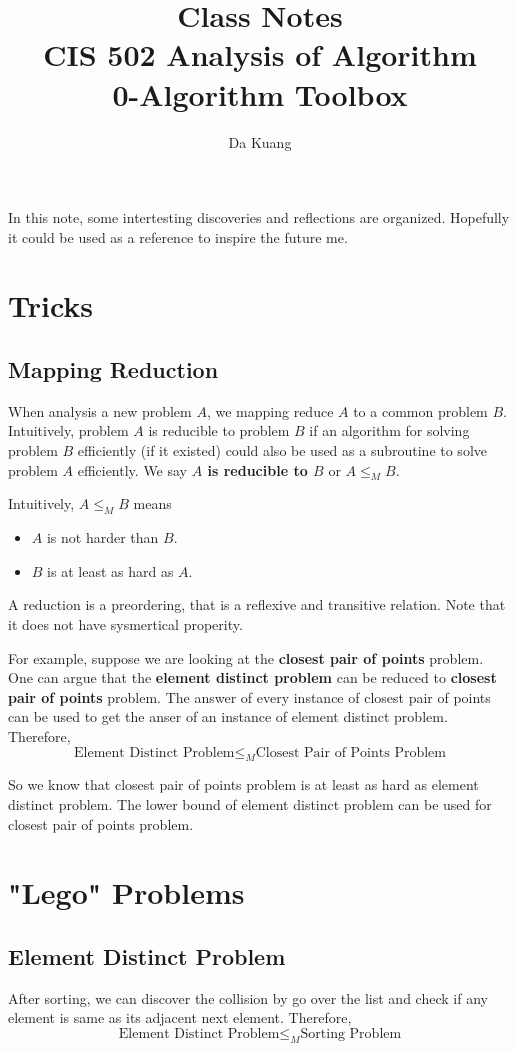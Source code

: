 \documentclass[en,hazy,blue,screen,14pt]{elegantnote}
\title{Class Notes\\CIS 502 Analysis of Algorithm\\0-Algorithm Toolbox}
\author{Da Kuang}
\institute{University of Pennsylvania}
\date{}
\begin{document}
\maketitle
\newpage
In this note, some intertesting discoveries and reflections are organized. Hopefully it could be used as a reference to inspire the future me.

\section{Tricks}
\subsection{Mapping Reduction}
When analysis a new problem $A$, we mapping reduce $A$ to a common problem $B$. Intuitively, problem $A$ is reducible to problem $B$ if an algorithm for solving problem $B$ efficiently (if it existed) could also be used as a subroutine to solve problem $A$ efficiently. We say \textbf{$A$ is reducible to $B$} or \textbf{$A \le_M B$}. 

\begin{tcolorbox}[breakable,notitle,boxrule=0pt,colback=blue!20,colframe=blue!20]

Intuitively, $A \le_M B$ means 
\begin{itemize}
	\item $A$ is not harder than $B$.
	\item $B$ is at least as hard as $A$.
\end{itemize}

\end{tcolorbox}

A reduction is a preordering, that is a reflexive and transitive relation. Note that it does not have sysmertical properity.

For example, suppose we are looking at the \textbf{closest pair of points} problem. One can argue that the \textbf{element distinct problem} can be reduced to \textbf{closest pair of points} problem. The answer of every instance of closest pair of points can be used to get the anser of an instance of element distinct problem. Therefore, 
\[\text{Element Distinct Problem} \le_M \text{Closest Pair of Points Problem} \]

So we know that closest pair of points problem is at least as hard as element distinct problem. The lower bound of element distinct problem can be used for closest pair of points problem.

\section{"Lego" Problems}
\subsection{Element Distinct Problem}
After sorting, we can discover the collision by go over the list and check if any element is same as its adjacent next element. Therefore, 
\[\text{Element Distinct Problem} \le_M \text{Sorting Problem} \]
\end{document}
